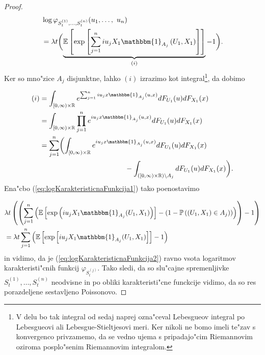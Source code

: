 \documentclass[12pt, a4paper, reqno]{amsart}
\theoremstyle{definition}
\theoremstyle{plain}
\newcommand{\R}{\mathbb{R}}
\newcommand{\E}{\mathbb{E}}
\newcommand{\Prob}{\mathbb{P}}
\newcommand{\1}{\mathds{1}}
\begin{document}
\begin{proof}
            \begin{align}
                &\log\varphi_{S_t^{(1)},\dots, S_t^{(n)}}(u_1, \dots, \ u_n) \nonumber \\
                    &= \lambda t \biggl(\underbrace{\E\left[\exp\left[\sum_{j = 1}^niu_jX_1\mathbbm{1}_{A_j}\left(U_1, X_1\right)\right]\right]}_{(i)} - 1\biggr). \label{eq:logKarakteristicnaFunkcija1}
            \end{align}
            Ker so mno"zice $A_j$ disjunktne, lahko $(i)$ izrazimo kot integral\footnote{V delu bo 
            tak integral od sedaj naprej ozna"ceval Lebesgueov integral po Lebesgueovi 
            ali Lebesgue-Stieltjesovi meri. Ker nikoli ne bomo imeli te"zav s konvergenco
            privzamemo, da se vedno ujema s pripadajo"cim Riemannovim oziroma posplo"senim Riemannovim integralom.}, da dobimo

            \begin{align*}
                (i) &= \int_{[0, \infty)\times\R}e^{\sum_{j = 1}^niu_jx\mathbbm{1}_{A_j}(u, x)}dF_{U_1}(u)dF_{X_1}(x)\\
                    &= \int_{[0, \infty)\times\R}\prod_{j = 1}^ne^{iu_jx\mathbbm{1}_{A_j}(u, x)}dF_{U_1}(u)dF_{X_1}(x)\\
                    &= \sum_{j=1}^n\biggl(\int_{[0, \infty)\times\R}e^{iu_jx\mathbbm{1}_{A_j}(u, x)}dF_{U_1}(u)dF_{X_1}(x)  \\
                    & \qquad \qquad \qquad \qquad \qquad \qquad  - \int_{([0, \infty)\times\R) \setminus A_j}dF_{U_1}(u)dF_{X_1}(x)\biggr).\\
            \end{align*}
            Ena"cbo (\ref{eq:logKarakteristicnaFunkcija1}) tako poenostavimo

            \begin{align}
                    &\lambda t \left(\left(\sum_{j=1}^n\left(\E\left[\exp\left(iu_j X_1 \mathbbm{1}_{A_j}(U_1, X_1)\right)\right] - \left( 1 - \Prob\left((U_1, X_1) \in A_j\right)\right)\right)\right) - 1\right)\nonumber \\
                    &= \lambda t \sum_{j=1}^n\left(\E\left[\exp\left[iu_jX_1\mathbbm{1}_{A_j}(U_1, X_1)\right]\right] - 1\right) \label{eq:logKarakteristicnaFunkcija2}
            \end{align} 
            in vidimo, da je (\ref{eq:logKarakteristicnaFunkcija2}) ravno vsota logaritmov karakteristi"cnih funkcij $\varphi_{S_t^{(j)}}$. 
            Tako sledi, da so slu"cajne spremenljivke $S_t^{(1)}, \dots, S_t^{(n)}$ neodvisne in po obliki karakteristi"cne 
            funckcije vidimo, da so res porazdeljene sestavljeno Poissonovo.
        \end{proof}
\end{document}
